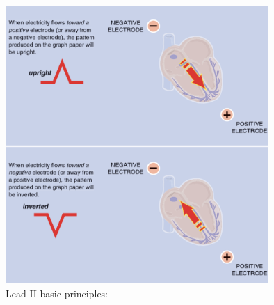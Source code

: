 \documentclass[LaM,binding=0.6cm]{sapthesis}
\begin{document}
\begin{figure}[H]  \centering
	\includegraphics[width=100mm,scale=0.7]{ruleflow}
	\caption{Lead II basic principles: \cite{ecgbook}}
	\label{fig:ruleflow}
\end{figure}
\end{document}
